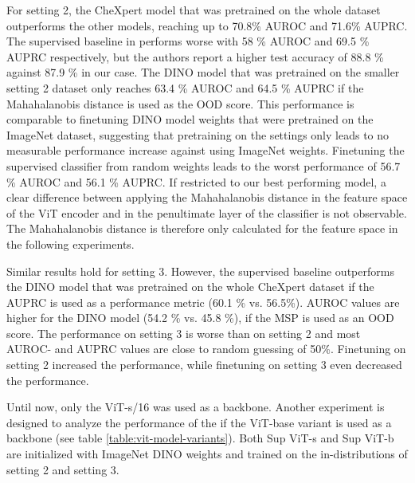 For setting 2, the CheXpert model that was pretrained on the whole dataset outperforms the other models, reaching up to 70.8\% AUROC and 71.6\% AUPRC.
The supervised baseline in \citep{Berger2021} performs worse with 58 \% AUROC and 69.5 \% AUPRC respectively, but the authors report a higher test accuracy of 88.8 \% against 87.9 \% in our case.
The DINO model that was pretrained on the smaller setting 2 dataset only reaches 63.4 \% AUROC and 64.5 \% AUPRC if the Mahahalanobis distance is used as the OOD score.
This performance is comparable to finetuning DINO model weights that were pretrained on the ImageNet dataset, suggesting that pretraining on the settings only leads to no measurable performance increase against using ImageNet weights.
Finetuning the supervised classifier from random weights leads to the worst performance of 56.7 \% AUROC and 56.1 \% AUPRC.
If restricted to our best performing model, a clear difference between applying the Mahahalanobis distance in the feature space of the ViT encoder and in the penultimate layer of the classifier is not observable.
The Mahahalanobis distance is therefore only calculated for the feature space in the following experiments.
\par
Similar results hold for setting 3. However, the supervised baseline outperforms the DINO model that was pretrained on the whole CheXpert dataset if the AUPRC is used as a performance metric (60.1 \% vs. 56.5\%).
AUROC values are higher for the DINO model (54.2 \% vs. 45.8 \%), if the MSP is used as an OOD score.
The performance on setting 3 is worse than on setting 2 and most AUROC- and AUPRC values are close to random guessing of 50\%.
Finetuning on setting 2 increased the performance, while finetuning on setting 3 even decreased the performance.
\par
Until now, only the ViT-s/16 was used as a backbone.
Another experiment is designed to analyze the performance of the if the ViT-base variant is used as a backbone (see table \ref{table:vit-model-variants}).
Both Sup ViT-s and Sup ViT-b are initialized with ImageNet DINO weights and trained on the in-distributions of setting 2 and setting 3.
